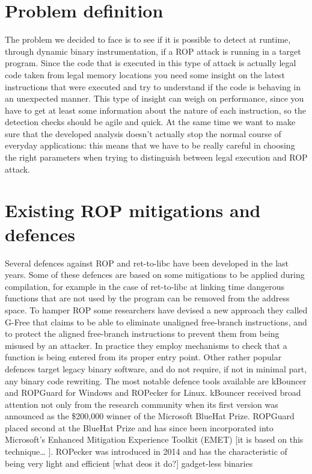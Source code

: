 \documentclass[Lau,binding=0.6cm]{sapthesis}
\begin{document}
\section{Problem definition}

The problem we decided to face is to see if it is possible to detect at runtime, through dynamic binary instrumentation, if a ROP attack is running in a target program. Since the code that is executed in this type of attack is actually legal code taken from legal memory locations you need some insight on the latest instructions that were executed and try to understand if the code is behaving in an unexpected manner. This type of insight can weigh on performance, since you have to get at least some information about the nature of each instruction, so the detection checks should be agile and quick. At the same time we want to make sure that the developed analysis doesn’t actually stop the normal course of everyday applications: this means that we have to be really careful in choosing the right parameters when trying to distinguish between legal execution and ROP attack.

\section{Existing ROP mitigations and defences}

Several defences against ROP and ret-to-libc have been developed in the last years. Some of these defences are based on some mitigations to be applied during compilation, for example in the case of ret-to-libc at linking time dangerous functions that are not used by the program can be removed from the address space. To hamper ROP some researchers have devised a new approach they called G-Free that claims to be able to eliminate unaligned free-branch instructions, and to protect the aligned free-branch instructions to prevent them from being misused by an attacker. In practice they employ mechanisms to check that a function is being entered from its proper entry point. Other rather popular defences target legacy binary software, and do not require, if not in minimal part, any binary code rewriting. The most notable defence tools available are kBouncer and ROPGuard for Windows and ROPecker for Linux. kBouncer received broad attention not only from the research community when its first version was announced as the \$200,000 winner of the Microsoft BlueHat Prize. ROPGuard placed second at the BlueHat Prize and has since been incorporated into Microsoft’s Enhanced Mitigation Experience Toolkit (EMET) [it is based on this technique… ]. ROPecker was introduced in 2014 and has the characteristic of being very light and efficient [what deos it do?]
gadget-less binaries
\end{document}
